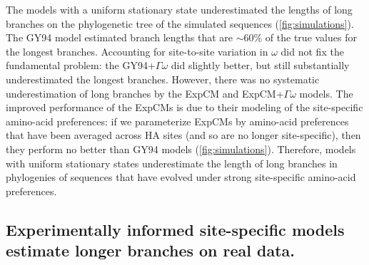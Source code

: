 \documentclass[11pt]{article}
\begin{document}
The models with a uniform stationary state underestimated the lengths of long branches on the phylogenetic tree of the simulated sequences (\ref{fig:simulations}). 
The GY94 model estimated branch lengths that are $\sim$60\% of the true values for the longest branches. 
Accounting for site-to-site variation in $\omega$ did not fix the fundamental problem: the GY94+$\Gamma\omega$ did slightly better, but still substantially underestimated the longest branches.
However, there was no systematic underestimation of long branches by the ExpCM and ExpCM+$\Gamma\omega$ models.
The improved performance of the ExpCMs is due to their modeling of the site-specific amino-acid preferences: if we parameterize ExpCMs by amino-acid preferences that have been averaged across HA sites (and so are no longer site-specific), then they perform no better than GY94 models (\ref{fig:simulations}).
Therefore, models with uniform stationary states underestimate the length of long branches in phylogenies of sequences that have evolved under strong site-specific amino-acid preferences.


\subsection*{Experimentally informed site-specific models estimate longer branches on real data.}
\end{document}
